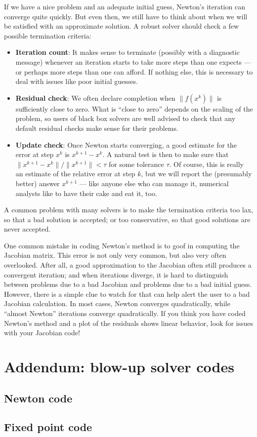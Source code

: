 \documentclass[12pt, leqno]{article} %
\begin{document}
If we have a nice problem and an adequate initial guess, Newton's
iteration can converge quite quickly.  But even then, we still have
to think about when we will be satisfied with an approximate solution.
A robust solver should check a few possible termination criteria:
\begin{itemize}
\item {\bf Iteration count}: It makes sense to terminate (possibly
  with a diagnostic message) whenever an iteration starts to take more
  steps than one expects --- or perhaps more steps than one can
  afford.  If nothing else, this is necessary to deal with issues like
  poor initial guesses.
\item {\bf Residual check}: We often declare completion when
  $\|f(x^k)\|$ is sufficiently close to zero.  What is ``close to zero''
  depends on the scaling of the problem, so users of black box solvers
  are well advised to check that any default residual checks make
  sense for their problems.
\item {\bf Update check}: Once Newton starts converging, a good
  estimate for the error at step $x^k$ is $x^{k+1}-x^k$.  A natural
  test is then to make sure that $\|x^{k+1}-x^k\|/\|x^{k+1}\| < \tau$
  for some tolerance $\tau$.  Of course, this is really an estimate
  of the relative error at step $k$, but we will report the (presumably
  better) answer $x^{k+1}$ --- like anyone else who can manage it,
  numerical analysts like to have their cake and eat it, too.
\end{itemize}
A common problem with many solvers is to make the termination criteria
too lax, so that a bad solution is accepted; or too conservative, so
that good solutions are never accepted.

One common mistake in coding Newton's method is to goof in computing
the Jacobian matrix.  This error is not only very common, but also
very often overlooked.  After all, a good approximation to the
Jacobian often still produces a convergent iteration; and when
iterations diverge, it is hard to distinguish between problems due to
a bad Jacobian and problems due to a bad initial guess.  However,
there is a simple clue to watch for that can help alert the user
to a bad Jacobian calculation.  In most cases, Newton converges
quadratically, while ``almost Newton'' iterations converge
quadratically.  If you think you have coded Newton's method and a
plot of the residuals shows linear behavior, look for issues with
your Jacobian code!

\newpage

\section*{Addendum: blow-up solver codes}

\subsection*{Newton code}


\newpage

\subsection*{Fixed point code}

\end{document}
